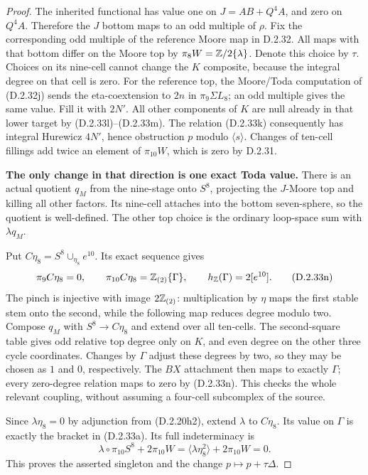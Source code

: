 \begin{proof}
The inherited functional has value one on $J=AB+Q^4A$,
and zero on $Q^4A$. Therefore the $J$ bottom maps to an
odd multiple of $\rho$. Fix the corresponding odd multiple
of the reference Moore map in \textup{D.2.32}.
All maps with that bottom differ on the Moore top by
$\pi_8W=\mathbb Z/2\{\lambda\}$. Denote this choice by $\tau$.
Choices on its nine-cell cannot change the $K$ composite,
because the integral degree on that cell is zero.
For the reference top, the Moore/Toda computation of
\textup{(D.2.32j)} sends the eta-coextension to $2n$ in
$\pi_9\Sigma L_8$; an odd multiple gives the same value.
Fill it with $2N'$. All other components of $K$ are null
already in that lower target by \textup{(D.2.33l)--(D.2.33m)}.
The relation \textup{(D.2.33k)} consequently has integral
Hurewicz $4N'$, hence obstruction $p$ modulo $\langle s\rangle$.
Changes of ten-cell fillings add twice an element of
$\pi_{10}W$, which is zero by \textup{D.2.31}.

\medskip\noindent
\textbf{The only change in that direction is one exact Toda value.}
There is an actual quotient $q_M$ from the nine-stage onto
$S^8$, projecting the $J$-Moore top and killing all other
factors. Its nine-cell attaches into the bottom seven-sphere,
so the quotient is well-defined. The other top choice is the
ordinary loop-space sum with $\lambda q_M$.

Put $C\eta_8=S^8\cup_{\eta_8}e^{10}$. Its exact sequence gives
\[
 \pi_9C\eta_8=0,\qquad
 \pi_{10}C\eta_8=\mathbb Z_{(2)}\{\Gamma\},
                \qquad h_{\mathbb Z}(\Gamma)=2[e^{10}].
 \tag{D.2.33n}
\]
The pinch is injective with image $2\mathbb Z_{(2)}$:
multiplication by $\eta$ maps the first stable stem onto
the second, while the following map reduces degree modulo two.
Compose $q_M$ with $S^8\to C\eta_8$ and extend over all
ten-cells. The second-square table gives odd relative top
degree only on $K$, and even degree on the other three cycle
coordinates. Changes by $\Gamma$ adjust these degrees by two,
so they may be chosen as $1$ and $0$, respectively.
The $BX$ attachment then maps to exactly $\Gamma$;
every zero-degree relation maps to zero by
\textup{(D.2.33n)}. This checks the whole relevant coupling,
without assuming a four-cell subcomplex of the source.

Since $\lambda\eta_8=0$ by adjunction from
\textup{(D.2.20h2)}, extend $\lambda$ to $C\eta_8$.
Its value on $\Gamma$ is exactly the bracket in
\textup{(D.2.33a)}. Its full indeterminacy is
\[
 \lambda\circ\pi_{10}S^8+2\pi_{10}W
       =\langle\lambda\eta_8^2\rangle+2\pi_{10}W=0.
 \tag{D.2.33o}
\]
This proves the asserted singleton and the change
$p\mapsto p+\tau\Delta$.


\end{proof}
